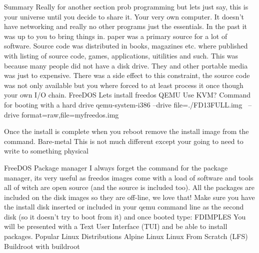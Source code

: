 Summary
Really for another section prob programming but lets just say, this is your universe until you decide to share it. Your very own computer. It doesn’t have networking and really no other programs just the essentials. In the past it was up to you to bring things in. paper was a primary source for a lot of software. Source code was distributed in books, magazines etc. where published with listing of source code, games, applications, uitilities and such. This was because many people did not have a disk drive. They and other portable media was just to expensive. There was a side effect to this constraint, the source code was not only available but you where forced to at least process it once though your own I/O chain.
FreeDOS
Lets install freedos
QEMU
Use KVM?
Command for booting with a hard drive
qemu-system-i386 --drive file=./FD13FULL.img \
	--drive format=raw,file=myfreedos.img


Once the install is complete when you reboot remove the install image from the command.
Bare-metal
This is not much different except your going to need to write to something physical

FreeDOS Package manager
I always forget the command for the package manager, its very useful as freedos images come with a load of software and tools all of witch are open source (and the source is included too). All the packages are included on the disk images so they are off-line, we love that!
Make sure you have the install disk inserted or included in your qemu command line as the second disk (so it doesn’t try to boot from it) and once booted type:
FDIMPLES
You will be presented with a Text User Interface (TUI) and be able to install packages.
Popular Linux Distributions
Alpine Linux
Linux From Scratch (LFS)
Buildroot with buildroot


